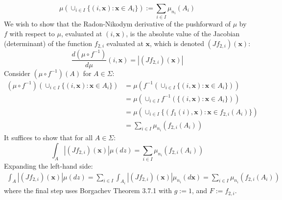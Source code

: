\documentclass[twoside]{article}
\begin{document}
\begin{equation}
\mu(\cup_{i \in I} \{(i, \mathbf{x}) : \mathbf{x} \in A_i\}) := \sum_{i \in I} \mu_{n_i}(A_i)
\end{equation}
We wish to show that the Radon-Nikodym derivative of the pushforward of $\mu$ by $f$ with respect to $\mu$, evaluated at $(i, \mathbf{x})$, is the absolute value of the Jacobian (determinant) of the function $f_{2,i}$ evaluated at $\mathbf{x}$, which is denoted $(J f_{2,i})(\mathbf{x})$:
\begin{equation}
\frac{d (\mu \circ f^{-1})}{d \mu}(i, \mathbf{x})
= \left| (Jf_{2,i})(\mathbf{x})\right|
\end{equation}
Consider $(\mu \circ f^{-1})(A)$ for $A \in \Sigma$:
\begin{align}
(\mu \circ f^{-1})(\cup_{i \in I} \{ (i, \mathbf{x}) : \mathbf{x} \in A_i \})
&= \mu(f^{-1}(\cup_{i \in I} \{ (i, \mathbf{x}) : \mathbf{x} \in A_i \}))\\
&= \mu(\cup_{i \in I} f^{-1}(\{ (i, \mathbf{x}) : \mathbf{x} \in A_i \}))\\
&= \mu(\cup_{i \in I} \{ (f_1(i), \mathbf{x}) : \mathbf{x} \in f_{2,i}(A_i) \})\\
&= \sum_{i \in I} \mu_{n_i}(f_{2,i}(A_i))
\end{align}
It suffices to show that for all $A \in \Sigma$:
\begin{equation}
\int_A \left| (Jf_{2,i})(\mathbf{x})\right| \mu(dz) = \sum_{i \in I} \mu_{n_i}(f_{2,i}(A_i))
\end{equation}
Expanding the left-hand side:
\begin{align}
\int_A \left| (Jf_{2,i})(\mathbf{x})\right| \mu(dz)
= \sum_{i \in I} \int_{A_i} \left| (Jf_{2,i})(\mathbf{x})\right| \mu_{n_i}(d \mathbf{x}) %
= \sum_{i \in I} \mu_{n_i}(f_{2,i}(A_i)) %
\end{align}
where the final step uses Borgachev Theorem 3.7.1 with $g := 1$, and $F := f_{2,i}$.
\end{document}
